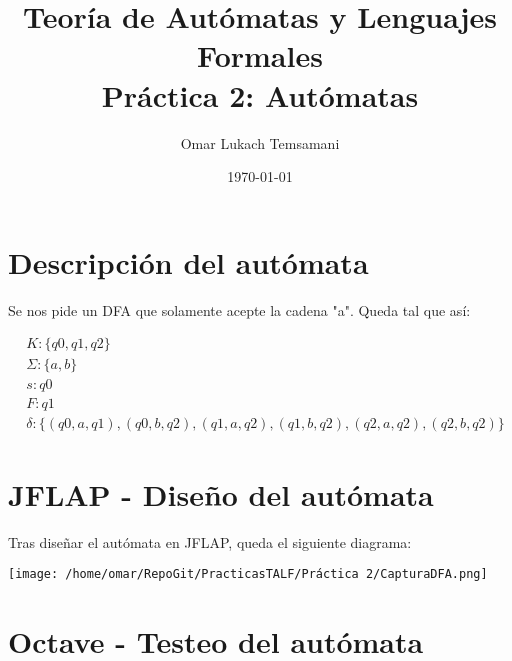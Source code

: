 \documentclass[fleqn, 10pt]{article}
\title{Teoría de Autómatas y Lenguajes Formales\\[.4\baselineskip]Práctica 2: Autómatas}
\author{Omar Lukach Temsamani}
\date{\today}
\theoremstyle{plain}
\theoremstyle{definition}
\begin{document}
\maketitle

\section{Descripción del autómata}

Se nos pide un DFA que solamente acepte la cadena "a". Queda tal que así:

  \begin{ceqn}	%
    \begin{align*} %
    &K: \{q0, q1, q2\}\\
    &\Sigma :\{a,b\}\\
    &s: q0\\
    &F: q1\\
    &\delta: \{(q0, a, q1), (q0, b, q2), (q1,a,q2),(q1,b,q2),(q2,a,q2),(q2,b,q2)\}
    \end{align*} 
  \end{ceqn} 
  
\section{JFLAP - Diseño del autómata}

Tras diseñar el autómata en JFLAP, queda el siguiente diagrama:

\texttt{[image: /home/omar/RepoGit/PracticasTALF/Práctica 2/CapturaDFA.png]}

\section{Octave - Testeo del autómata}
\end{document}
